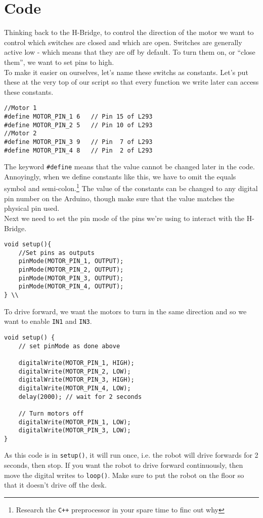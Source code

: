 \documentclass[../TinyBot.tex]{subfiles}
\begin{document}
\section{Code}

Thinking back to the H-Bridge, to control the direction of the motor we want to control which
switches are closed and which are open. Switches are generally active low - which means that 
they are off by default. To turn them on, or ``close them'', we want to set pins to high. \\

To make it easier on ourselves, let's name these switchs as constants. Let's put these
at the very top of our script so that every function we write later can access these constants. \\

\begin{lstlisting}
//Motor 1
#define MOTOR_PIN_1 6   // Pin 15 of L293
#define MOTOR_PIN_2 5   // Pin 10 of L293
//Motor 2
#define MOTOR_PIN_3 9   // Pin  7 of L293
#define MOTOR_PIN_4 8   // Pin  2 of L293
\end{lstlisting}

The keyword \lstinline[]!#define! means that the value cannot be changed later in the code.
Annoyingly, when we define constants like this, we have to omit the equals symbol and
semi-colon.\footnote{Research the \lstinline[]!C++! preprocessor in your spare time to
finc out why} The value of the constants can be changed to any digital pin number on the
Arduino, though make sure that the value matches the physical pin used. \\

Next we need to set the pin mode of the pins we're using to interact with the H-Bridge.

\begin{lstlisting}
void setup(){
    //Set pins as outputs
    pinMode(MOTOR_PIN_1, OUTPUT);
    pinMode(MOTOR_PIN_2, OUTPUT);
    pinMode(MOTOR_PIN_3, OUTPUT);
    pinMode(MOTOR_PIN_4, OUTPUT);
} \\
\end{lstlisting}

To drive forward, we want the motors to turn in the same direction and so we want to
enable \lstinline[]!IN1! and \lstinline[]!IN3!. \\

\begin{lstlisting}
void setup() {
    // set pinMode as done above

    digitalWrite(MOTOR_PIN_1, HIGH);
    digitalWrite(MOTOR_PIN_2, LOW);
    digitalWrite(MOTOR_PIN_3, HIGH);
    digitalWrite(MOTOR_PIN_4, LOW);
    delay(2000); // wait for 2 seconds

    // Turn motors off
    digitalWrite(MOTOR_PIN_1, LOW);
    digitalWrite(MOTOR_PIN_3, LOW);
}
\end{lstlisting}
As this code is in \lstinline[]!setup()!, it will run once, i.e. the robot will drive forwards
for 2 seconds, then stop. If you want the robot to drive forward continuously, then move the
digital writes to \lstinline[]!loop()!. Make sure to put the robot on the floor so that it
doesn't drive off the desk. \\
\end{document}
